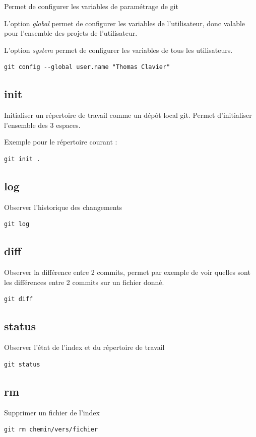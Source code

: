 \documentclass[a4paper]{article}
\begin{document}
Permet de configurer les variables de paramétrage de git

L'option \textit{global} permet de configurer les variables de l'utilisateur, donc valable pour l'ensemble des projets de l'utilisateur.

L'option \textit{system} permet de configurer les variables de tous les utilisateurs.

\begin{verbatim}
git config --global user.name "Thomas Clavier"
\end{verbatim}

\subsection*{init}

Initialiser un répertoire de travail comme un dépôt local git. Permet d'initialiser l'ensemble des 3 espaces.

Exemple pour le répertoire courant : 
\begin{verbatim}
git init .
\end{verbatim}

\subsection*{log}
Observer l'historique des changements
\begin{verbatim}
git log
\end{verbatim}

\subsection*{diff}
Observer la différence entre 2 commits, permet par exemple de voir quelles sont les différences entre 2 commits sur un fichier donné.

\begin{verbatim}
git diff
\end{verbatim}

\subsection*{status}
Observer l'état de l'index et du répertoire de travail
\begin{verbatim}
git status
\end{verbatim}

\subsection*{rm}
Supprimer un fichier de l'index
\begin{verbatim}
git rm chemin/vers/fichier
\end{verbatim}
\end{document}
